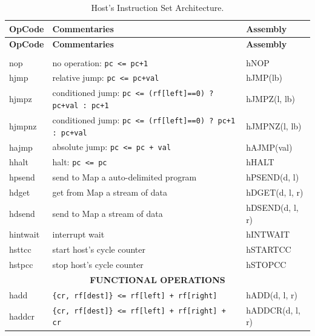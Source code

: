 {\small
{\centering
\begin{longtable}{|l|l|l|}
\caption{Host's Instruction Set Architecture.}
\label{tab:host_isa} \\
\hline
\textbf{OpCode} & \textbf{Commentaries} & \textbf{Assembly} \\
\hline
\endfirsthead
\hline
\textbf{OpCode} & \textbf{Commentaries} & \textbf{Assembly} \\
\hline
\endhead
\hline
\endfoot
\hline
\endlastfoot
\multicolumn{3}{|c|}{\textbf{CONTROL OPERATIONS}} \\
\hline
nop    & no operation: \texttt{pc <= pc+1}                            & hNOP          \\ \hline
hjmp   & relative jump: \texttt{pc <= pc+val}                         & hJMP(lb)      \\ \hline
hjmpz  & conditioned jump: \texttt{pc <= (rf[left]==0) ? pc+val : pc+1} & hJMPZ(l, lb)  \\ \hline
hjmpnz & conditioned jump: \texttt{pc <= (rf[left]==0) ? pc+1 : pc+val} & hJMPNZ(l, lb) \\ \hline
hajmp  & absolute jump: \texttt{pc <= pc + val}                       & hAJMP(val)    \\ \hline
hhalt  & halt: \texttt{pc <= pc}                                      & hHALT         \\ \hline
hpsend & send to Map a auto-delimited program                         & hPSEND(d, l)  \\ \hline
hdget  & get from Map a stream of data                                & hDGET(d, l, r) \\ \hline
hdsend & send to Map a stream of data                                 & hDSEND(d, l, r) \\ \hline
hintwait & interrupt wait                                             & hINTWAIT      \\ \hline
hsttcc & start host's cycle counter                                   & hSTARTCC      \\ \hline
hstpcc & stop host's cycle counter                                    & hSTOPCC       \\ \hline
\multicolumn{3}{|c|}{\textbf{FUNCTIONAL OPERATIONS}} \\
\hline
hadd   & \texttt{\{cr, rf[dest]\} <= rf[left] + rf[right]}            & hADD(d, l, r) \\ \hline
haddcr & \texttt{\{cr, rf[dest]\} <= rf[left] + rf[right] + cr}       & hADDCR(d, l, r) \\ \hline

\end{longtable}}}
